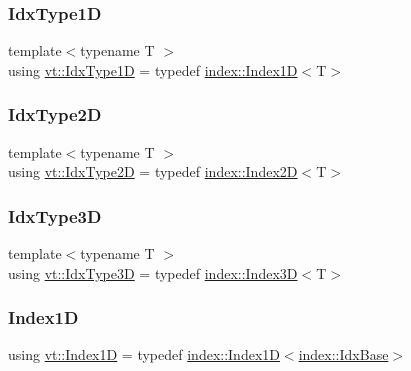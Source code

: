 \mbox{\label{namespacevt_a36127c6500f2311908c959be653da40e}} 
\subsubsection{\texorpdfstring{Idx\+Type1D}{IdxType1D}}
{\footnotesize\ttfamily template$<$typename T $>$ \\
using \hyperlink{namespacevt_a36127c6500f2311908c959be653da40e}{vt\+::\+Idx\+Type1D} = typedef \hyperlink{namespacevt_1_1index_a091a4f5a7a2c993d9727eaa60cf67d81}{index\+::\+Index1D}$<$T$>$}

\mbox{\label{namespacevt_ab0fbc5ddf69b5aa0ed6a8d1658b504eb}} 
\subsubsection{\texorpdfstring{Idx\+Type2D}{IdxType2D}}
{\footnotesize\ttfamily template$<$typename T $>$ \\
using \hyperlink{namespacevt_ab0fbc5ddf69b5aa0ed6a8d1658b504eb}{vt\+::\+Idx\+Type2D} = typedef \hyperlink{namespacevt_1_1index_a8373801efc8343f24d6e8ba57df40a69}{index\+::\+Index2D}$<$T$>$}

\mbox{\label{namespacevt_a65e4a83c0567ecb7a54b78e9b8e7d7ab}} 
\subsubsection{\texorpdfstring{Idx\+Type3D}{IdxType3D}}
{\footnotesize\ttfamily template$<$typename T $>$ \\
using \hyperlink{namespacevt_a65e4a83c0567ecb7a54b78e9b8e7d7ab}{vt\+::\+Idx\+Type3D} = typedef \hyperlink{namespacevt_1_1index_a2c09a09f7346d370a0bcbbfb0d4459cd}{index\+::\+Index3D}$<$T$>$}

\mbox{\label{namespacevt_a5540efc78234273e1796fb003fe4d234}} 
\subsubsection{\texorpdfstring{Index1D}{Index1D}}
{\footnotesize\ttfamily using \hyperlink{namespacevt_a5540efc78234273e1796fb003fe4d234}{vt\+::\+Index1D} = typedef \hyperlink{namespacevt_1_1index_a091a4f5a7a2c993d9727eaa60cf67d81}{index\+::\+Index1D}$<$\hyperlink{namespacevt_1_1index_a0dbb8d47463da27c1436e8e4ddb02743}{index\+::\+Idx\+Base}$>$}

